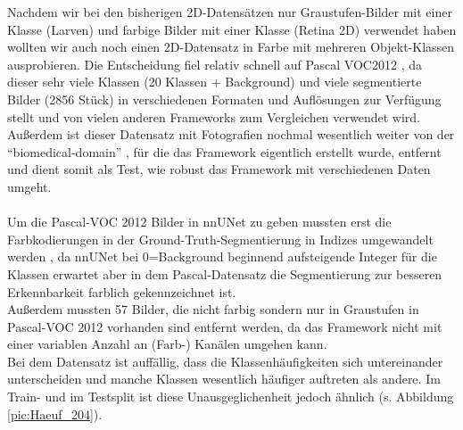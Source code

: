 Nachdem wir bei den bisherigen 2D-Datensätzen nur Graustufen-Bilder mit einer Klasse (Larven) und farbige Bilder mit einer Klasse (Retina 2D) verwendet haben wollten wir auch noch einen 2D-Datensatz in Farbe mit mehreren Objekt-Klassen ausprobieren. Die Entscheidung fiel relativ schnell auf Pascal VOC2012 \cite{PascalVOCDatensatz}, da dieser sehr viele Klassen (20 Klassen + Background) und viele segmentierte Bilder (2856 Stück) in verschiedenen Formaten und Auflösungen zur Verfügung stellt und von vielen anderen Frameworks zum Vergleichen verwendet wird. Außerdem ist dieser Datensatz mit Fotografien nochmal wesentlich weiter von der \enquote{biomedical-domain} \cite{nnunetGithub2D-Daten}, für die das Framework eigentlich erstellt wurde, entfernt und dient somit als Test, wie robust das Framework mit verschiedenen Daten umgeht.\\\\
Um die Pascal-VOC 2012 Bilder in nnUNet zu geben mussten erst die Farbkodierungen in der Ground-Truth-Segmentierung in Indizes umgewandelt werden \cite{autoMLGithub}, da nnUNet bei 0=Background beginnend aufsteigende Integer für die Klassen erwartet aber in dem Pascal-Datensatz \cite{PascalVOCDatensatz} die Segmentierung zur besseren Erkennbarkeit farblich gekennzeichnet ist.\\
Außerdem mussten 57 Bilder, die nicht farbig sondern nur in Graustufen in Pascal-VOC 2012 \cite{PascalVOCDatensatz} vorhanden sind entfernt werden, da das Framework nicht mit einer variablen Anzahl an (Farb-) Kanälen umgehen kann.\\
Bei dem Datensatz ist auffällig, dass die Klassenhäufigkeiten sich untereinander unterscheiden und manche Klassen wesentlich häufiger auftreten als andere. Im Train- und im Testsplit ist diese Unausgeglichenheit jedoch ähnlich (s. Abbildung \ref{pic:Haeuf_204}).

